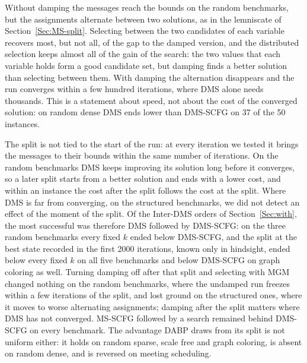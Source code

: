 Without damping the messages reach the bounds on the random benchmarks, but the assignments alternate between two solutions, as in the lemniscate of Section~\ref{Sec:MS-split}. Selecting between the two candidates of each variable recovers most, but not all, of the gap to the damped version, and the distributed selection keeps almost all of the gain of the search: the two values that each variable holds form a good candidate set, but damping finds a better solution than selecting between them. With damping the alternation disappears and the run converges within a few hundred iterations, where DMS alone needs thousands. This is a statement about speed, not about the cost of the converged solution: on random dense DMS ends lower than DMS-SCFG on 37 of the 50 instances.

The split is not tied to the start of the run: at every iteration we tested it brings the messages to their bounds within the same number of iterations. On the random benchmarks DMS keeps improving its solution long before it converges, so a later split starts from a better solution and ends with a lower cost, and within an instance the cost after the split follows the cost at the split. Where DMS is far from converging, on the structured benchmarks, we did not detect an effect of the moment of the split. Of the Inter-DMS orders of Section~\ref{Sec:with}, the most successful was therefore DMS followed by DMS-SCFG: on the three random benchmarks every fixed $k$ ended below DMS-SCFG, and the split at the best state recorded in the first 2000 iterations, known only in hindsight, ended below every fixed $k$ on all five benchmarks and below DMS-SCFG on graph coloring as well. Turning damping off after that split and selecting with MGM changed nothing on the random benchmarks, where the undamped run freezes within a few iterations of the split, and lost ground on the structured ones, where it moves to worse alternating assignments; damping after the split matters where DMS has not converged. MS-SCFG followed by a search remained behind DMS-SCFG on every benchmark. The advantage DABP draws from its split is not uniform either: it holds on random sparse, scale free and graph coloring, is absent on random dense, and is reversed on meeting scheduling.
